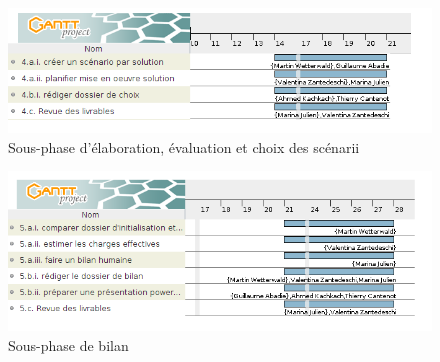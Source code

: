 \begin{figure}[h]
    \centering
    \includegraphics[scale=0.65]{images/SPIE_4.png}
    \caption{Sous-phase d'élaboration, évaluation et choix des scénarii}
    \label{diagram:si_map}
\end{figure}

\begin{figure}[h]
    \centering
    \includegraphics[scale=0.65]{images/SPIE_5.png}
    \caption{Sous-phase de bilan}
    \label{diagram:si_map}
\end{figure}
